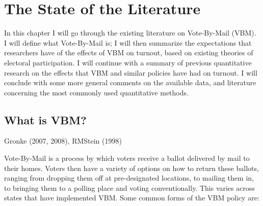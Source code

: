 \documentclass[12pt,twoside]{reedthesis}
\begin{document}
  \chapter{The State of the Literature}\label{rmd-basics}
  
  In this chapter I will go through the existing literature on
  Vote-By-Mail (VBM). I will define what Vote-By-Mail is; I will then
  summarize the expectations that researchers have of the effects of VBM
  on turnout, based on existing theories of electoral participation. I
  will continue with a summary of previous quantitative research on the
  effects that VBM and similar policies have had on turnout. I will
  conclude with some more general comments on the available data, and
  literature concerning the most commonly used quantitative methods.
  
  \section{What is VBM?}\label{what-is-vbm}
  
  Gronke (2007, 2008), RMStein (1998)
  
  Vote-By-Mail is a process by which voters receive a ballot delivered by
  mail to their homes. Voters then have a variety of options on how to
  return these ballots, ranging from dropping them off at pre-designated
  locations, to mailing them in, to bringing them to a polling place and
  voting conventionally. This varies across states that have implemented
  VBM. Some common forms of the VBM policy are:
  
\end{document}

